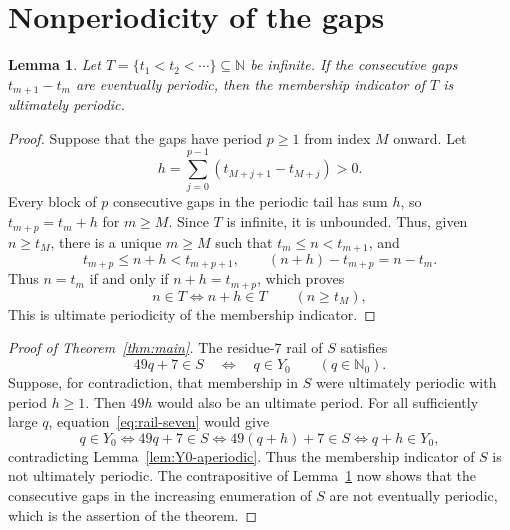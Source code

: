 \documentclass[11pt,letterpaper]{article}
\newtheorem{lemma}[theorem]{Lemma}
\newcommand{\N}{\mathbb{N}}
\newcommand{\Nzero}{\mathbb{N}_0}
\begin{document}
\section{Nonperiodicity of the gaps}

\begin{lemma}\label{lem:gaps-imply-membership}
Let \(T=\{t_1<t_2<\cdots\}\subseteq\N\) be infinite. If the consecutive gaps \(t_{m+1}-t_m\) are eventually periodic, then the membership indicator of \(T\) is ultimately periodic.
\end{lemma}

\begin{proof}
Suppose that the gaps have period \(p\geq1\) from index \(M\) onward. Let
\[
h=\sum_{j=0}^{p-1}(t_{M+j+1}-t_{M+j})>0.
\]
Every block of \(p\) consecutive gaps in the periodic tail has sum $h$, so \(t_{m+p}=t_m+h\) for \(m\geq M\). Since \(T\) is infinite, it is unbounded. Thus, given \(n\geq t_M\), there is a unique \(m\geq M\) such that \(t_m\leq n<t_{m+1}\), and
\[
t_{m+p}\leq n+h<t_{m+p+1},
\qquad
(n+h)-t_{m+p}=n-t_m.
\]
Thus \(n=t_m\) if and only if \(n+h=t_{m+p}\), which proves
\[
n\in T\iff n+h\in T
\qquad(n\geq t_M),
\]
This is ultimate periodicity of the membership indicator.
\end{proof}

\begin{proof}[Proof of Theorem~\ref{thm:main}]
The residue-\(7\) rail of \(S\) satisfies
\begin{equation}\label{eq:rail-seven}
49q+7\in S\quad\Longleftrightarrow\quad q\in Y_0
\qquad(q\in\Nzero).
\end{equation}
Suppose, for contradiction, that membership in \(S\) were ultimately periodic with period \(h\geq1\). Then \(49h\) would also be an ultimate period. For all sufficiently large \(q\), equation~\eqref{eq:rail-seven} would give
\[
q\in Y_0
\iff49q+7\in S
\iff49(q+h)+7\in S
\iff q+h\in Y_0,
\]
contradicting Lemma~\ref{lem:Y0-aperiodic}. Thus the membership indicator of \(S\) is not ultimately periodic. The contrapositive of Lemma~\ref{lem:gaps-imply-membership} now shows that the consecutive gaps in the increasing enumeration of \(S\) are not eventually periodic, which is the assertion of the theorem.
\end{proof}
\end{document}
